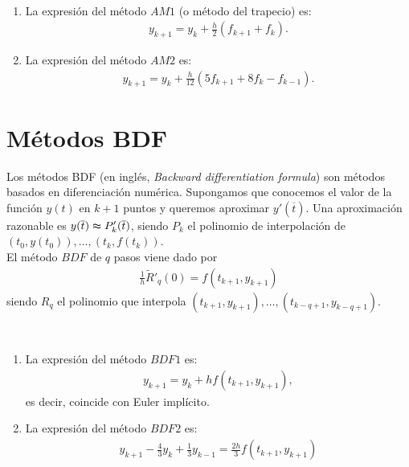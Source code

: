 \begin{ejemplo} \
\begin{enumerate} 
    \item La expresión del método $AM1$ (o método del trapecio) es:
    \begin{align*}
        y_{k+1} = y_k + \frac{h}{2}(f_{k+1} + f_k).
    \end{align*}
    \item La expresión del método $AM2$ es:
    \begin{align*}
        y_{k+1} = y_k +\frac{h}{12}(5f_{k+1} + 8f_{k} - f_{k-1}).
    \end{align*}
\end{enumerate}
\end{ejemplo}

\section{Métodos BDF}
\noindent Los métodos BDF (en inglés, \textit{Backward differentiation formula}) son métodos basados en diferenciación numérica. Supongamos que conocemos el valor de la función $y(t)$ en $k+1$ puntos y queremos aproximar $y'(\overline{t})$. Una aproximación razonable es $y(\overline{t}) \thickapprox P_k'(\overline{t})$, siendo $P_k$ el polinomio de interpolación de $(t_0,y(t_0)),\ldots,(t_k,f(t_k))$.
\\
\newline
El método $BDF$ de $q$ pasos viene dado por
\begin{align*}
    \frac{1}{h} \widetilde{R}'_q(0) = f(t_{k+1},y_{k+1})
\end{align*}
siendo $R_q$ el polinomio que interpola $(t_{k+1},y_{k+1}),\ldots,(t_{k-q+1},y_{k-q+1})$.

\begin{ejemplo} \
\begin{enumerate}
\item La expresión del método $BDF1$ es:
    \begin{align*}
        y_{k+1} = y_k + hf(t_{k+1},y_{k+1}),
    \end{align*}
    es decir, coincide con Euler implícito.
    \item La expresión del método $BDF2$ es:
    \begin{align*}
        y_{k+1} -\frac{4}{3}y_k + \frac{1}{3}y_{k-1} = \frac{2h}{3}f(t_{k+1},y_{k+1})
    \end{align*}
\end{enumerate}
\end{ejemplo}

